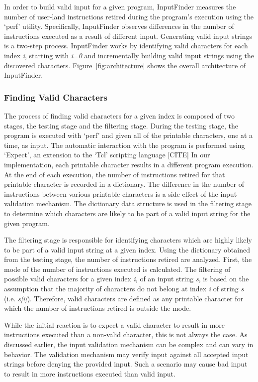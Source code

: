 \documentclass[10pt,twocolumn]{article}
\def \tool {InputFinder}
\begin{document}
In order to build valid input for a given program, \tool{} measures the number of user-land instructions retired during the program's execution using the `perf' utility.
Specifically, \tool{} observes differences in the number of instructions executed as a result of different input.
Generating valid input strings is a two-step process.
\tool{} works by identifying valid characters for each index \textit{i}, starting with \textit{i=0} and incrementally building valid input strings using the discovered characters.
Figure~\ref{fig:architecture} shows the overall architecture of \tool{}.

\subsubsection{Finding Valid Characters}

The process of finding valid characters for a given index is composed of two stages, the testing stage and the filtering stage.
During the testing stage, the program is executed with `perf' and given all of the printable characters, one at a time, as input.
The automatic interaction with the program is performed using `Expect', an extension to the `Tcl' scripting language [CITE]
In our implementation, each printable character results in a different program execution.
At the end of each execution, the number of instructions retired for that printable character is recorded in a dictionary.
The difference in the number of instructions between various printable characters is a side effect of the input validation mechanism.
The dictionary data structure is used in the filtering stage to determine which characters are likely to be part of a valid input string for the given program.

The filtering stage is responsible for identifying characters which are highly likely to be part of a valid input string at a given index.
Using the dictionary obtained from the testing stage, the number of instructions retired are analyzed.
First, the mode of the number of instructions executed is calculated.
The filtering of possible valid characters for a given index \textit{i}, of an input string \textit{s}, is based on the assumption that the majority of characters do not belong at index \textit{i} of string \textit{s} (i.e. \textit{s[i]}).
Therefore, valid characters are defined as any printable character for which the number of instructions retired is outside the mode.

While the initial reaction is to expect a valid character to result in more instructions executed than a non-valid character, this is not always the case.
As discussed earlier, the input validation mechanism can be complex and can vary in behavior.
The validation mechanism may verify input against all accepted input strings before denying the provided input.
Such a scenario may cause bad input to result in more instructions executed than valid input.
\end{document}
